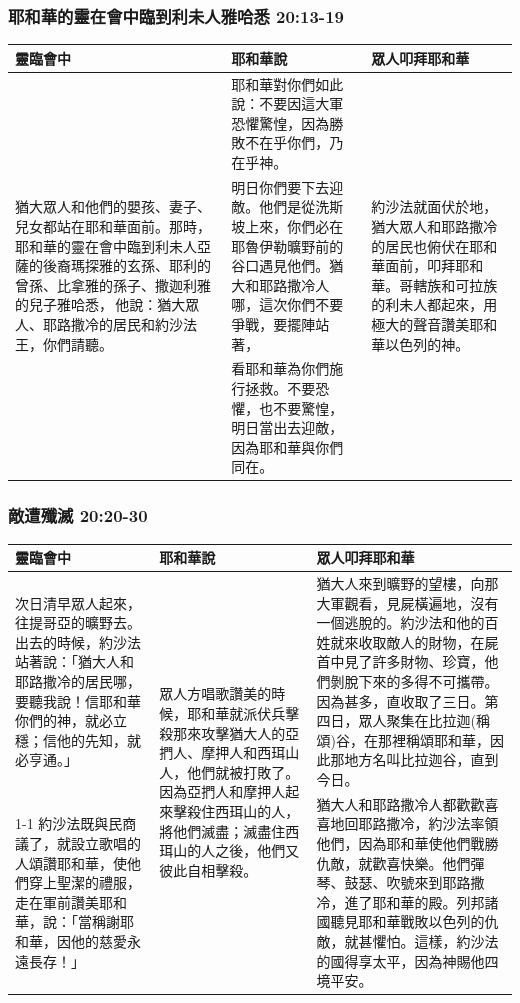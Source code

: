 \subsubsection{耶和華的靈在會中臨到利未人雅哈悉 20:13-19}
\begin{table}[H]
\centering 
\begin{tabular}{p{5.25cm}|p{7.5cm}|p{3.5cm}}\hline\hline
靈臨會中&耶和華說&眾人叩拜耶和華\\\hline\hline
\multirow{3}{5.35cm}{猶大眾人和他們的嬰孩、妻子、兒女都站在耶和華面前。那時，耶和華的靈在會中臨到利未人亞薩的後裔瑪探雅的玄孫、耶利的曾孫、比拿雅的孫子、撒迦利雅的兒子雅哈悉， 他說：猶大眾人、耶路撒冷的居民和約沙法王，你們請聽。}
&耶和華對你們如此說：不要因這大軍恐懼驚惶，因為勝敗不在乎你們，乃在乎神。 
&\multirow{3}{3.7cm}{約沙法就面伏於地，猶大眾人和耶路撒冷的居民也俯伏在耶和華面前，叩拜耶和華。哥轄族和可拉族的利未人都起來，用極大的聲音讚美耶和華以色列的神。}\\\cline{2-2}
&明日你們要下去迎敵。他們是從洗斯坡上來，你們必在耶魯伊勒曠野前的谷口遇見他們。猶大和耶路撒冷人哪，這次你們不要爭戰，要擺陣站著，&\\\cline{2-2}
&看耶和華為你們施行拯救。不要恐懼，也不要驚惶，明日當出去迎敵，因為耶和華與你們同在。&\\\hline
\end{tabular}
\end{table}

\subsubsection{敵遭殲滅 20:20-30}
\begin{table}[H]
\centering 
\begin{tabular}{p{4.75cm}|p{3.25cm}|p{8.5cm}}\hline\hline
靈臨會中&耶和華說&眾人叩拜耶和華\\\hline\hline
次日清早眾人起來，往提哥亞的曠野去。出去的時候，約沙法站著說：「猶大人和耶路撒冷的居民哪，要聽我說！信耶和華你們的神，就必立穩；信他的先知，就必亨通。」
&\multirow{3}{3.35cm}{眾人方唱歌讚美的時候，耶和華就派伏兵擊殺那來攻擊猶大人的亞捫人、摩押人和西珥山人，他們就被打敗了。因為亞捫人和摩押人起來擊殺住西珥山的人，將他們滅盡；滅盡住西珥山的人之後，他們又彼此自相擊殺。}
&猶大人來到曠野的望樓，向那大軍觀看，見屍橫遍地，沒有一個逃脫的。約沙法和他的百姓就來收取敵人的財物，在屍首中見了許多財物、珍寶，他們剝脫下來的多得不可攜帶。因為甚多，直收取了三日。第四日，眾人聚集在比拉迦(稱頌)谷，在那裡稱頌耶和華，因此那地方名叫比拉迦谷，直到今日。\\\cline{1-1}\cline{3-3}
約沙法既與民商議了，就設立歌唱的人頌讚耶和華，使他們穿上聖潔的禮服，走在軍前讚美耶和華，說：「當稱謝耶和華，因他的慈愛永遠長存！」&&猶大人和耶路撒冷人都歡歡喜喜地回耶路撒冷，約沙法率領他們，因為耶和華使他們戰勝仇敵，就歡喜快樂。他們彈琴、鼓瑟、吹號來到耶路撒冷，進了耶和華的殿。列邦諸國聽見耶和華戰敗以色列的仇敵，就甚懼怕。這樣，約沙法的國得享太平，因為神賜他四境平安。\\\hline
\end{tabular}
\end{table}
 
